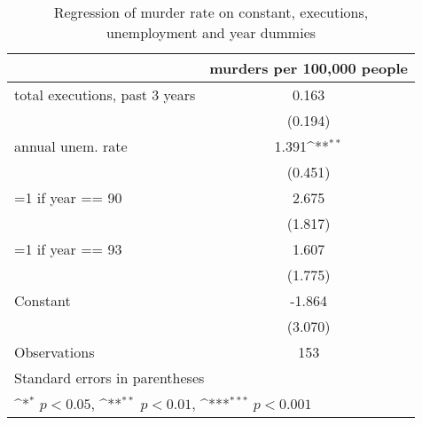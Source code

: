 \begin{table}[htbp]\centering
\def\sym#1{\ifmmode^{#1}\else\(^{#1}\)\fi}
\caption{Regression of murder rate on constant, executions, unemployment and year dummies}
\begin{tabular}{l*{1}{c}}
\hline\hline
                    &\multicolumn{1}{c}{murders per 100,000 people}\\
\hline
total executions, past 3 years&       0.163         \\
                    &     (0.194)         \\
[1em]
annual unem. rate   &       1.391\sym{**} \\
                    &     (0.451)         \\
[1em]
=1 if year == 90    &       2.675         \\
                    &     (1.817)         \\
[1em]
=1 if year == 93    &       1.607         \\
                    &     (1.775)         \\
[1em]
Constant            &      -1.864         \\
                    &     (3.070)         \\
\hline
Observations        &         153         \\
\hline\hline
\multicolumn{2}{l}{\footnotesize Standard errors in parentheses}\\
\multicolumn{2}{l}{\footnotesize \sym{*} \(p<0.05\), \sym{**} \(p<0.01\), \sym{***} \(p<0.001\)}\\
\end{tabular}
\end{table}
